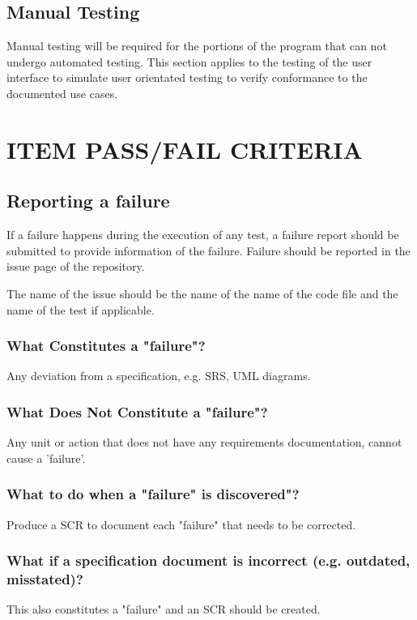 \documentclass[report]{article}
\begin{document}
\subsection{Manual Testing}
Manual testing will be required for the portions of the program that can not undergo automated testing. This section applies to the testing of the user interface to simulate user orientated testing to verify conformance to the documented use cases.


\section[ITEM PASS/FAIL CRITERIA]{ITEM PASS/FAIL CRITERIA}

\subsection{Reporting a failure}

If a failure happens during the execution of any test, a failure report should be submitted to provide information of the failure. Failure should be reported in the issue page of the repository. 

The name of the issue should be the name of the name of the code file and the name of the test if applicable.

\subsubsection{What Constitutes a "failure"?}
Any deviation from a specification, e.g. SRS, UML diagrams.

\subsubsection{What Does Not Constitute a "failure"?}
Any unit or action that does not have any requirements documentation, cannot cause a 'failure'.

\subsubsection{What to do when a "failure" is discovered"?}
Produce a SCR to document each "failure" that needs to be corrected.

\subsubsection{What if a specification document is incorrect (e.g. outdated, misstated)?}
This also constitutes a "failure" and an SCR should be created.
\end{document}
